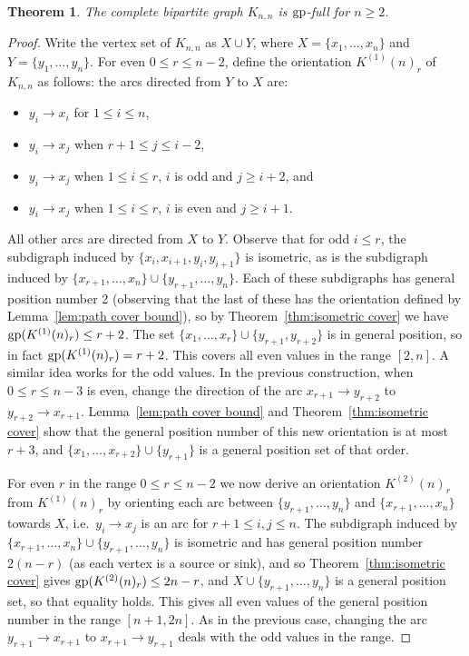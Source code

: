 \documentclass[a4paper,12pt]{article}
\newtheorem{theorem}{Theorem}[section]
\theoremstyle{definition}
\newcommand{\gp}{{\rm gp}}
\begin{document}
	\begin{theorem}
		The complete bipartite graph $K_{n,n}$ is $\gp $-full for $n \geq 2$.
	\end{theorem}
	\begin{proof}
		Write the vertex set of $K_{n,n}$ as $X \cup Y$, where $X = \{ x_1,\ldots ,x_n\} $ and $Y= \{ y_1,\ldots ,y_n\} $. For even $0 \leq r \leq n-2$, define the orientation $K^{(1)}(n)_r$ of $K_{n,n}$ as follows: the arcs directed from $Y$ to $X$ are:
		\begin{itemize}
			\item $y_i \rightarrow x_i$ for $1 \leq i \leq n$,
			\item $y_i \rightarrow x_j$ when $r+1 \leq j \leq i-2$, 
			\item $y_i \rightarrow x_j$ when $1 \leq i \leq r$, $i$ is odd and $j \geq i+2$, and
			\item $y_i \rightarrow x_j$ when $1 \leq i \leq r$, $i$ is even and $j \geq i+1$.
		\end{itemize}
		All other arcs are directed from $X$ to $Y$. Observe that for odd $i \leq r$, the subdigraph induced by $\{ x_i,x_{i+1},y_i,y_{i+1}\} $ is isometric, as is the subdigraph induced by $\{ x_{r+1},\ldots ,x_n\} \cup \{ y_{r+1},\ldots ,y_n\} $. Each of these subdigraphs has general position number 2 (observing that the last of these has the orientation defined by Lemma~\ref{lem:path cover bound}), so by Theorem~\ref{thm:isometric cover} we have $\gp (K^{(1)}(n)_r) \leq r+2$. The set $\{ x_1,\ldots ,x_r\} \cup \{ y_{r+1},y_{r+2}\} $ is in general position, so in fact $\gp (K^{(1)}(n)_r) = r+2$. This covers all even values in the range $[2,n]$. A similar idea works for the odd values. In the previous construction, when $0 \leq r \leq n-3$ is even, change the direction of the arc $x_{r+1} \rightarrow y_{r+2}$ to $y_{r+2} \rightarrow x_{r+1}$. Lemma~\ref{lem:path cover bound} and Theorem~\ref{thm:isometric cover} show that the general position number of this new orientation is at most $r+3$, and $\{ x_1,\ldots ,x_{r+2}\} \cup \{ y_{r+1}\} $ is a general position set of that order.
		
		For even $r$ in the range $0 \leq r \leq n-2$ we now derive an orientation $K^{(2)}(n)_r$ from $K^{(1)}(n)_r$ by orienting each arc between $\{ y_{r+1},\ldots ,y_n\} $ and $\{ x_{r+1},\ldots ,x_n\} $ towards $X$, i.e.\ $y_i \rightarrow x_j$ is an arc for $r+1 \leq i,j \leq n$. The subdigraph induced by $\{ x_{r+1},\ldots ,x_n\} \cup \{ y_{r+1},\ldots ,y_n\} $ is isometric and has general position number $2(n-r)$ (as each vertex is a source or sink), and so Theorem~\ref{thm:isometric cover} gives $\gp (K^{(2)}(n)_r) \leq 2n-r$, and $X \cup \{ y_{r+1},\ldots ,y_n\} $ is a general position set, so that equality holds. This gives all even values of the general position number in the range $[n+1,2n]$. As in the previous case, changing the arc $y_{r+1} \rightarrow x_{r+1}$ to $x_{r+1} \rightarrow y_{r+1}$ deals with the odd values in the range.   
	\end{proof}
	
\end{document}
